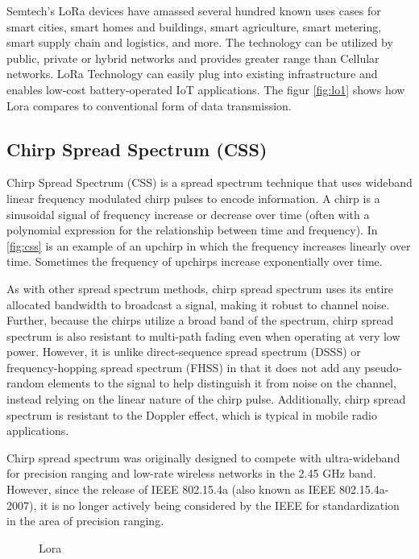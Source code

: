 Semtech’s LoRa devices have amassed several hundred known uses cases for smart cities, smart homes and buildings, smart agriculture, smart metering, smart supply chain and logistics, and more. The technology can be utilized by public, private or hybrid networks and provides greater range than Cellular networks. LoRa Technology can easily plug into existing infrastructure and enables low-cost battery-operated IoT applications. The figur \ref{fig:lo1} shows how Lora compares to conventional form of data transmission. 

\subsection{Chirp Spread Spectrum (CSS)}
Chirp Spread Spectrum (CSS) is a spread spectrum technique that uses wideband linear frequency modulated chirp pulses to encode information. A chirp is a sinusoidal signal of frequency increase or decrease over time (often with a polynomial expression for the relationship between time and frequency)\cite{lorabk}. In \ref{fig:css} is an example of an upchirp in which the frequency increases linearly over time. Sometimes the frequency of upchirps increase exponentially over time. 

As with other spread spectrum methods, chirp spread spectrum uses its entire allocated bandwidth to broadcast a signal, making it robust to channel noise. Further, because the chirps utilize a broad band of the spectrum, chirp spread spectrum is also resistant to multi-path fading even when operating at very low power. However, it is unlike direct-sequence spread spectrum (DSSS) or frequency-hopping spread spectrum (FHSS) in that it does not add any pseudo-random elements to the signal to help distinguish it from noise on the channel, instead relying on the linear nature of the chirp pulse. Additionally, chirp spread spectrum is resistant to the Doppler effect, which is typical in mobile radio applications.

Chirp spread spectrum was originally designed to compete with ultra-wideband for precision ranging and low-rate wireless networks in the 2.45 GHz band. However, since the release of IEEE 802.15.4a (also known as IEEE 802.15.4a-2007), it is no longer actively being considered by the IEEE for standardization in the area of precision ranging.




\begin{figure}[p]
\begin{center}
\end{center}

\caption{Lora}
\label{fig:lora_and_tht}
\end{figure}

